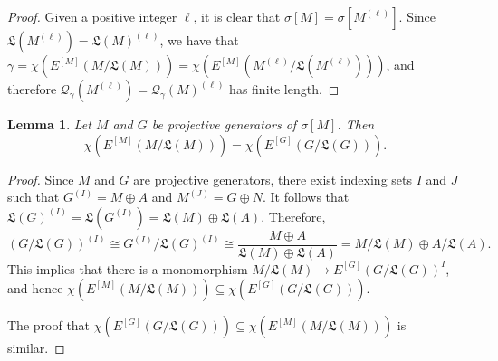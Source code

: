 \documentclass{amsart}
\newtheorem{lemma}[thm]{Lemma}
\newtheorem{prop}[thm]{Proposition}
\theoremstyle{definition}
\theoremstyle{remark}
\numberwithin{equation}{section}
\newcommand{\sm}{\sigma[M]}
\begin{document}
	\begin{proof}
		Given a positive integer $\ell$,
		it is clear that $\sm=\sigma[M^{(\ell)}]$. 
		Since $\mathfrak{L}(M^{(\ell)})=\mathfrak{L}(M)^{(\ell)}$, 
		we have that 
		$\gamma=\chi(E^{[M]}(M/\mathfrak{L}(M)))=
		\chi\left( E^{[M]}\left( M^{(\ell)}/\mathfrak{L}(M^{(\ell)})\right) \right) $, 
		and therefore 
		$\mathcal{Q}_\gamma(M^{(\ell)})=\mathcal{Q}_\gamma(M)^{(\ell)}$ 
		has finite length.
	\end{proof}
	
	
	
	
	\begin{lemma}\label{gentt}
		Let $M$ and $G$ be projective generators of $\sm$.  Then 
		\[\chi(E^{[M]}(M/\mathfrak{L}(M)))=\chi(E^{[G]}(G/\mathfrak{L}(G))).\]
	\end{lemma}
	
	\begin{proof}
		Since $M$ and $G$ are projective generators, 
		there exist indexing sets $I$ and $J$ 
		such that $G^{(I)}=M\oplus A$ and $M^{(J)}=G\oplus N$. 
		It follows that 
		$\mathfrak{L}(G)^{(I)}=\mathfrak{L}(G^{(I)})
		=\mathfrak{L}(M)\oplus \mathfrak{L}(A)$. 
		Therefore,
		\[\left( G/\mathfrak{L}(G)\right)^{(I)}\cong G^{(I)}/\mathfrak{L}(G)^{(I)}
		\cong \frac{M\oplus A}{\mathfrak{L}(M)\oplus 
			\mathfrak{L}(A)}=M/\mathfrak{L}(M)\oplus A/\mathfrak{L}(A).\]
		This implies that there is a monomorphism 
		$M/\mathfrak{L}(M)\to E^{[G]}\left( G/\mathfrak{L}(G)\right)^{I}$,
		and hence 
		$\chi(E^{[M]}(M/\mathfrak{L}(M)))\subseteq\chi(E^{[G]}(G/\mathfrak{L}(G)))$. 
		
		The proof that 
		$\chi(E^{[G]}(G/\mathfrak{L}(G))) 
		\subseteq
		\chi(E^{[M]}(M/\mathfrak{L}(M)))$
		is similar.
	\end{proof}
	
\end{document}
